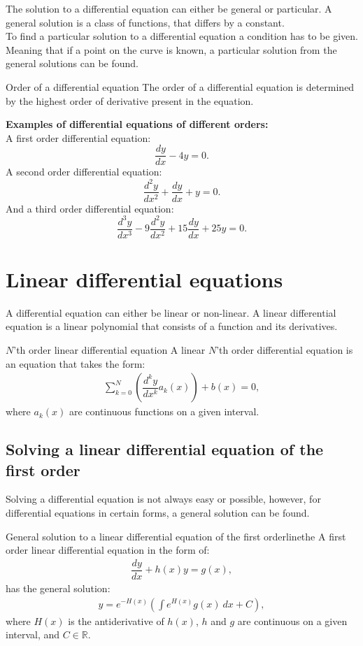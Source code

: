 The solution to a differential equation can either be general or particular. A general solution is a class of functions, that differs by a constant.
\\
To find a particular solution to a differential equation a condition has to be given. Meaning that if a point on the curve is known, a particular solution from the general solutions can be found.

\clearpage

\begin{definition}{Order of a differential equation}{}
The order of a differential equation is determined by the highest order of derivative present in the equation.
\end{definition} 

\noindent
\textbf{Examples of differential equations of different orders:}
\\
A first order differential equation:
$$\frac{dy}{dx}-4y=0. $$
A second order differential equation:
$$\frac{d^2y}{dx^2}+\frac{dy}{dx}+y = 0.$$
And a third order differential equation:
$$\frac{d^3y}{dx^3} - 9\frac{d^2y}{dx^2} + 15\frac{dy}{dx} + 25y = 0.$$

\section{Linear differential equations}
A differential equation can either be linear or non-linear. A linear differential equation is a linear polynomial that consists of a function and its derivatives.
\begin{definition}{$N$'th order linear differential equation}{}
A linear $N$'th order differential equation is an equation that takes the form:
\begin{align*}
\sum_{k=0}^{N}\left(\dfrac{d^ky}{dx^k}a_k(x)\right)+b(x)=0,
\end{align*}
where $a_k(x)$ are continuous functions on a given interval.
\end{definition}
\subsection{Solving a linear differential equation of the first order}
Solving  a differential equation is not always easy or possible, however, for differential equations in certain forms, a general solution can be found.

\begin{theorem}{General solution to a linear differential equation of the first order}{linethe}
A first order linear differential equation in the form of:
\begin{align} \label{FODE_form}
\dfrac{dy}{dx}+h(x)y=g(x),
\end{align}
has the general solution:
\begin{align} \label{FODE_solution}
y=e^{-H(x)}\left(\int e^{H(x)}g(x)\ dx+C\right),
\end{align}
where $H(x)$ is the antiderivative of $h(x)$, $h$ and $g$ are continuous on a given interval, and $C\in \mathbb{R}$.
\end{theorem}


